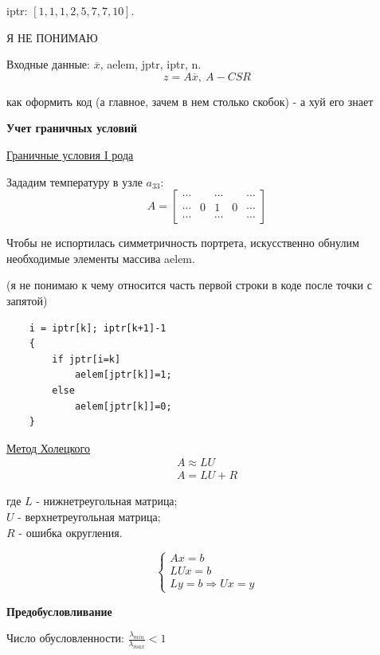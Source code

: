 \documentclass{bmstu}
\begin{document}
iptr: $\left[1, 1, 1, 2, 5, 7, 7, 10\right]$.

Я НЕ ПОНИМАЮ

Входные данные: $\overline{x}$, aelem, jptr, iptr, n.
\[
z = A\overline{x}, \ A - CSR
\]

как оформить код (а главное, зачем в нем столько скобок) - а хуй его знает

\newpage
	\begin{center}
	\textbf{Учет граничных условий}
\end{center}

\underline{Граничные условия I рода}

Зададим температуру в узле $a_{33}$:
\[
A=\begin{bmatrix}
	\cdots & &\cdots & &\cdots  \\
	\cdots & 0 & 1 & 0 & \cdots \\
	\cdots & &\cdots & &\cdots 
\end{bmatrix}
\]

Чтобы не испортилась симметричность портрета, искусственно обнулим необходимые элементы массива aelem.  

(я не понимаю к чему относится часть первой строки в коде после точки с запятой)

\begin{lstlisting}
	i = iptr[k]; iptr[k+1]-1
	{ 
		if jptr[i=k]
			aelem[jptr[k]]=1;
		else
			aelem[jptr[k]]=0;
	}
\end{lstlisting}

\underline{Метод Холецкого}
\[ \begin{matrix}
	A\approx LU\\A = LU+R
\end{matrix}
\]

где $L$ - нижнетреугольная матрица;\\
\hangindent=2.05cm
$U$ - верхнетреугольная матрица;\\
	$R$ - ошибка округления.
	
	\[
	\begin{cases}
		Ax= b \\ LUx= b \\ Ly = b \Rightarrow Ux=y
	\end{cases}
	\]
	
	\newpage
	\begin{center}
		\textbf{Предобусловливание}
	\end{center}
	
	Число обусловленности: $\frac{\lambda_{min}}{\lambda_{max}}<1$
	
\end{document}
